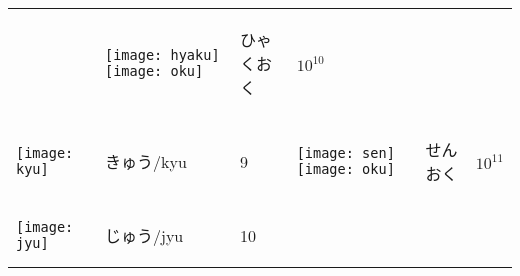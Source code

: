 \documentclass[a4paper,12pt]{extarticle}
\begin{document}
\begin{longtable}{|lll|lll|}
	                                   &
	\begin{minipage}{0.2\textwidth}
		\centerline{
			\texttt{[image: hyaku]}
			\texttt{[image: oku]}
		}
	\end{minipage}
	                                   &
	\begin{CJK}{UTF8}{min}ひゃくおく\end{CJK}
	                                   &
	$10^{10}$
	\\
	\begin{minipage}{0.2\textwidth}
		\centerline{
			\texttt{[image: kyu]}
		}
	\end{minipage}
	                                   &
	\begin{CJK}{UTF8}{min}きゅう/kyu\end{CJK}
	                                   &
	9

	                                   &
	\begin{minipage}{0.2\textwidth}
		\centerline{
			\texttt{[image: sen]}
			\texttt{[image: oku]}
		}
	\end{minipage}
	                                   &
	\begin{CJK}{UTF8}{min}せんおく\end{CJK}
	                                   &
	$10^{11}$
	\\
	\begin{minipage}{0.2\textwidth}
		\centerline{
			\texttt{[image: jyu]}
		}
	\end{minipage}
	                                   &
	\begin{CJK}{UTF8}{min}じゅう/jyu\end{CJK}
	                                   &
	10


\end{longtable}
\end{document}
